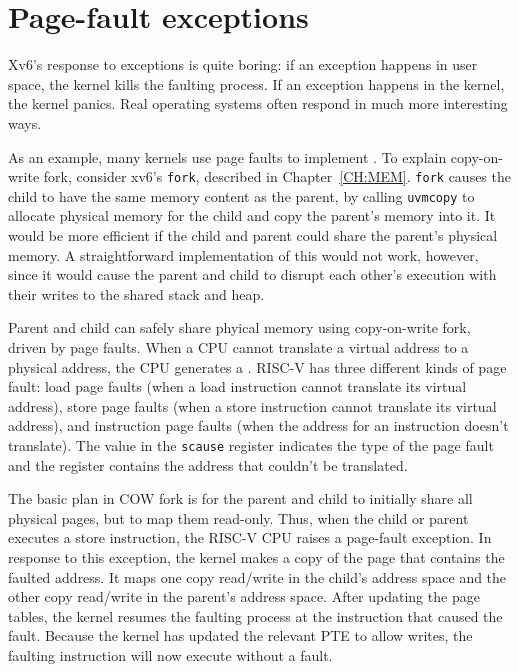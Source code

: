 \section{Page-fault exceptions}
\label{sec:pagefaults}

Xv6's response to exceptions is quite boring: if an exception happens
in user space, the kernel kills the faulting process.  If an
exception happens in the kernel, the kernel panics.  Real operating systems
often respond in much more interesting ways.

As an example,
many kernels use page faults to implement
.
To explain copy-on-write fork, consider xv6's \lstinline{fork},
described in Chapter~\ref{CH:MEM}.
\lstinline{fork} causes the child to have the same
memory content as the parent, by calling
\lstinline{uvmcopy}
to allocate physical memory for
the child and copy the parent's memory into it.
It would be more efficient if the child and parent could share 
the parent's physical memory.
A straightforward implementation of this would not work, however,
since it would cause the parent and child to disrupt each other's
execution with their writes to the shared stack and heap.

Parent and child can safely share phyical memory
using copy-on-write fork, driven by page faults.  When a
CPU cannot translate a virtual address to a physical address, the CPU
generates a .  RISC-V has three
different kinds of page fault: load page faults (when a load instruction cannot
translate its virtual address), store page faults (when a store
instruction cannot translate its virtual address), and instruction
page faults (when the address for an instruction doesn't translate).  The
value in the \lstinline{scause} register indicates the type of the
page fault and the  register contains the address
that couldn't be translated.

The basic plan in COW fork is for the parent and child to initially share all
physical pages, but to map them read-only.
Thus, when the child or parent executes a
store instruction, the RISC-V CPU raises a page-fault exception. In
response to this exception, the kernel makes a copy of the page that
contains the faulted address. It maps one copy read/write in the
child's address space and the other copy read/write in the parent's address
space.  After updating the page tables, the kernel resumes the
faulting process at the instruction that caused the fault. Because the
kernel has updated the relevant PTE to allow writes,
the faulting instruction will now
execute without a fault.

